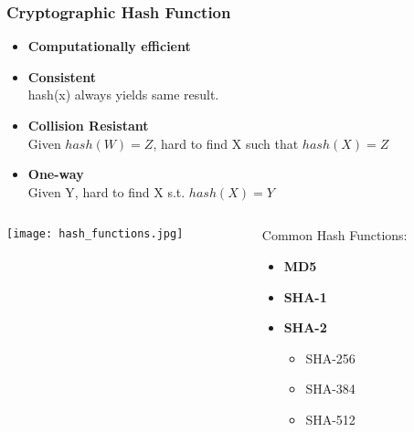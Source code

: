 \begin{frame}
    \frametitle{Cryptographic Hash Function}
    \begin{itemize}
        \item \textbf{Computationally efficient}
        \item \textbf{Consistent} \\
            hash(x) always yields same result.
        \item \textbf{Collision Resistant} \\
            Given $hash(W) = Z$, hard to find X such that $hash(X) = Z$
        \item \textbf{One-way} \\
            Given Y, hard to find X s.t. $hash(X) = Y$
    \end{itemize}
    \begin{columns}
        \begin{column}{0.5\textwidth}
            \texttt{[image: hash\_functions.jpg]}
        \end{column}
        \begin{column}{0.5\textwidth}
            Common Hash Functions:
            \begin{itemize}
                \item \textbf{MD5}
                \item \textbf{SHA-1}
                \item \textbf{SHA-2}
                    \begin{itemize}
                        \item SHA-256
                        \item SHA-384
                        \item SHA-512
                    \end{itemize}
            \end{itemize}
        \end{column}
    \end{columns}
\end{frame}

